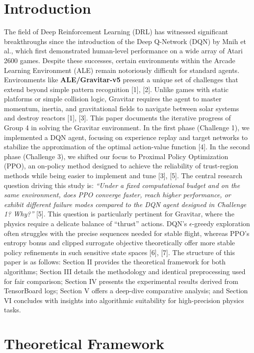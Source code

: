 \documentclass[conference]{IEEEtran}
\begin{document}
\section{Introduction}
The field of Deep Reinforcement Learning (DRL) has witnessed significant breakthroughs since the introduction of the Deep Q-Network (DQN) by Mnih et al., which first demonstrated human-level performance on a wide array of Atari 2600 games.
Despite these successes, certain environments within the Arcade Learning Environment (ALE) remain notoriously difficult for standard agents.
Environments like \textbf{ALE/Gravitar-v5} present a unique set of challenges that extend beyond simple pattern recognition [1], [2].
Unlike games with static platforms or simple collision logic, Gravitar requires the agent to master momentum, inertia, and gravitational fields to navigate between solar systems and destroy reactors [1], [3].
This paper documents the iterative progress of Group 4 in solving the Gravitar environment.
In the first phase (Challenge 1), we implemented a DQN agent, focusing on experience replay and target networks to stabilize the approximation of the optimal action-value function [4].
In the second phase (Challenge 3), we shifted our focus to Proximal Policy Optimization (PPO), an on-policy method designed to achieve the reliability of trust-region methods while being easier to implement and tune [3], [5].
The central research question driving this study is: \textit{``Under a fixed computational budget and on the same environment, does PPO converge faster, reach higher performance, or exhibit different failure modes compared to the DQN agent designed in Challenge 1?
Why?''} [5]. This question is particularly pertinent for Gravitar, where the physics require a delicate balance of ``thrust'' actions.
DQN's $\epsilon$-greedy exploration often struggles with the precise sequences needed for stable flight, whereas PPO's entropy bonus and clipped surrogate objective theoretically offer more stable policy refinements in such sensitive state spaces [6], [7].
The structure of this paper is as follows: Section II provides the theoretical framework for both algorithms;
Section III details the methodology and identical preprocessing used for fair comparison;
Section IV presents the experimental results derived from TensorBoard logs; Section V offers a deep-dive comparative analysis;
and Section VI concludes with insights into algorithmic suitability for high-precision physics tasks.

\section{Theoretical Framework}
\end{document}
